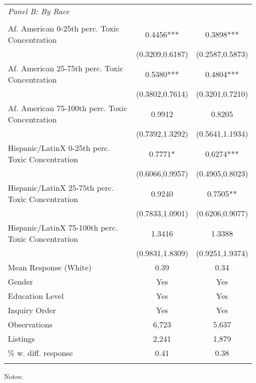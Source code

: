 \begin{table}[H]
\begin{threeparttable}
\begin{tabular}{@{\extracolsep{5pt}}lcc}
{\it Panel B: By Race }\\                                          &  &     \\
Af. American 0-25th perc. Toxic Concentration&      0.4456***&      0.3898***\\
                    &(0.3209,0.6187)   &(0.2587,0.5873)   \\
Af. American 25-75th perc. Toxic Concentration&      0.5380***&      0.4804***\\
                    &(0.3802,0.7614)   &(0.3201,0.7210)   \\
Af. American 75-100th perc. Toxic Concentration&      0.9912   &      0.8205   \\
                    &(0.7392,1.3292)   &(0.5641,1.1934)   \\
Hispanic/LatinX 0-25th perc. Toxic Concentration&      0.7771*  &      0.6274***\\
                    &(0.6066,0.9957)   &(0.4905,0.8023)   \\
Hispanic/LatinX 25-75th perc. Toxic Concentration&      0.9240   &      0.7505** \\
                    &(0.7833,1.0901)   &(0.6206,0.9077)   \\
Hispanic/LatinX 75-100th perc. Toxic Concentration&      1.3416   &      1.3388   \\
                    &(0.9831,1.8309)   &(0.9251,1.9374)   \\
\hline
 Mean Response (White)&        0.39   &        0.34   \\
\hline Gender       &         Yes   &         Yes   \\
Education Level     &         Yes   &         Yes   \\
Inquiry Order       &         Yes   &         Yes   \\
\hline Observations &       6,723   &       5,637   \\
Listings            &       2,241   &       1,879   \\
\% w. diff. response&        0.41   &        0.38   \\
            \hline \hline \\[-1.8ex] \end{tabular} \begin{tablenotes} \scriptsize \item Notes:   \end{tablenotes}  \end{threeparttable} \end{table}
